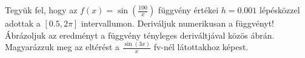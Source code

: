 Tegyük fel, hogy az $f(x)=\sin(\frac{100}{x})$ függvény értékei $h=0.001$ lépésközzel
adottak a $[0.5, 2\pi ]$ intervallumon. Deriváljuk numerikusan a függvényt! Ábrázoljuk
az eredményt a függvény tényleges deriváltjával közös ábrán. Magyarázzuk meg az eltérést
a $\frac{\sin(3x)}{x}$ fv-nél látottakhoz képest.


